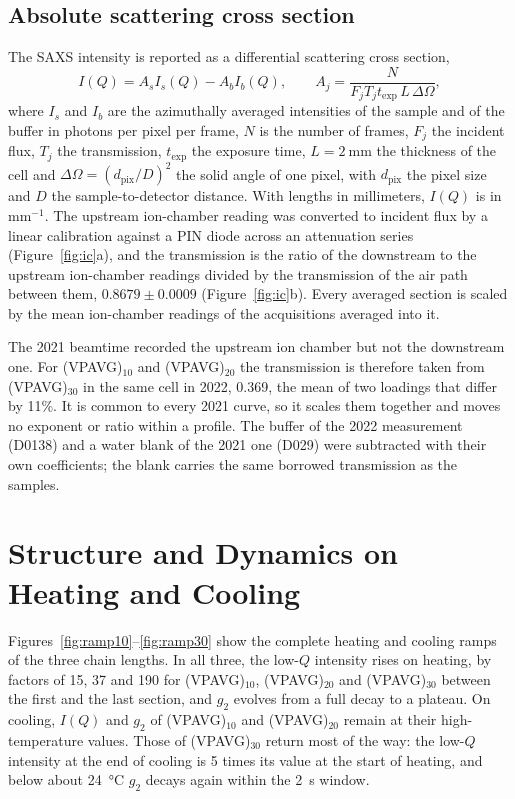 \documentclass[11pt]{article}
\newcommand{\VP}[1]{(VPAVG)$_{#1}$}
\begin{document}
\subsection{Absolute scattering cross section}

The SAXS intensity is reported as a differential scattering cross section,
\begin{equation}
  I(Q)=A_s I_s(Q)-A_b I_b(Q),\qquad A_j=\frac{N}{F_j T_j t_{\mathrm{exp}}\,L\,\Delta\Omega},
\end{equation}
where $I_s$ and $I_b$ are the azimuthally averaged intensities of the sample and of the buffer in photons per pixel per frame, $N$ is the number of frames, $F_j$ the incident flux, $T_j$ the transmission, $t_{\mathrm{exp}}$ the exposure time, $L=\SI{2}{\milli\meter}$ the thickness of the cell and $\Delta\Omega=(d_{\mathrm{pix}}/D)^2$ the solid angle of one pixel, with $d_{\mathrm{pix}}$ the pixel size and $D$ the sample-to-detector distance.\cite{Sheyfer2020-yb} With lengths in millimeters, $I(Q)$ is in mm$^{-1}$. The upstream ion-chamber reading was converted to incident flux by a linear calibration against a PIN diode across an attenuation series (Figure~\ref{fig:ic}a), and the transmission is the ratio of the downstream to the upstream ion-chamber readings divided by the transmission of the air path between them, $0.8679\pm0.0009$ (Figure~\ref{fig:ic}b). Every averaged section is scaled by the mean ion-chamber readings of the acquisitions averaged into it.

The 2021 beamtime recorded the upstream ion chamber but not the downstream one. For \VP{10} and \VP{20} the transmission is therefore taken from \VP{30} in the same cell in 2022, 0.369, the mean of two loadings that differ by 11\%. It is common to every 2021 curve, so it scales them together and moves no exponent or ratio within a profile. The buffer of the 2022 measurement (D0138) and a water blank of the 2021 one (D029) were subtracted with their own coefficients; the blank carries the same borrowed transmission as the samples.

\section{Structure and Dynamics on Heating and Cooling}

Figures~\ref{fig:ramp10}--\ref{fig:ramp30} show the complete heating and cooling ramps of the three chain lengths. In all three, the low-$Q$ intensity rises on heating, by factors of 15, 37 and 190 for \VP{10}, \VP{20} and \VP{30} between the first and the last section, and $g_2$ evolves from a full decay to a plateau. On cooling, $I(Q)$ and $g_2$ of \VP{10} and \VP{20} remain at their high-temperature values. Those of \VP{30} return most of the way: the low-$Q$ intensity at the end of cooling is 5 times its value at the start of heating, and below about \SI{24}{\degreeCelsius} $g_2$ decays again within the \SI{2}{\second} window.
\end{document}
